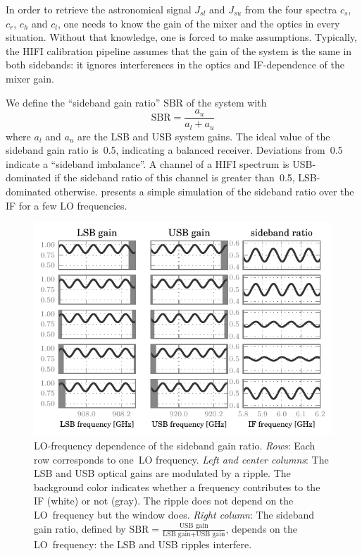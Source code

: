 In order to retrieve the astronomical signal $J_{sl}$ and  $J_{su}$
from the four spectra $c_s$, $c_r$, $c_h$ and $c_l$, one needs to know the gain of the mixer and the optics in every situation.
Without that knowledge, one is forced to make assumptions.
Typically, the HIFI calibration pipeline assumes that the gain of the system is the same in both sidebands: it ignores interferences in the optics and IF-dependence of the mixer gain.

We define the ``sideband gain ratio'' $\text{SBR}$ of the system with
\begin{equation}
    \text{SBR} = \frac{a_u}{a_l + a_u} \label{eq:sbr}
\end{equation}
where $a_l$ and $a_u$ are the LSB and USB system gains.
The ideal value of the sideband gain ratio is~\num{0.5}, indicating a balanced receiver.
Deviations from~\num{0.5} indicate a ``sideband imbalance''.
A channel of a HIFI spectrum is USB-dominated if the sideband ratio of this channel is greater than~\num{0.5}, LSB-dominated otherwise.
 presents a simple simulation of the sideband ratio over the IF for a few LO frequencies.

\begin{figure}[bp]
    \centering
    \includegraphics{lo_scan_of_ripple}
    \caption{
        LO-frequency dependence of the sideband gain ratio.
        \emph{Rows}:
            Each row corresponds to one~LO frequency.
        \emph{Left and center columns}:
            The LSB and USB optical gains are modulated by a ripple.
            The background color indicates whether a frequency
            contributes to the IF (white) or not (gray).
            The ripple does not depend on the LO~frequency but the window does.
        \emph{Right column}:
            The sideband gain ratio,
            defined by
            $\text{SBR}=\frac{\text{USB gain}}{\text{LSB gain}+\text{USB gain}}$,
            depends on the LO~frequency:
            the LSB and USB ripples interfere.
    }
    \label{fig:lo_scan_of_ripple}
\end{figure}

